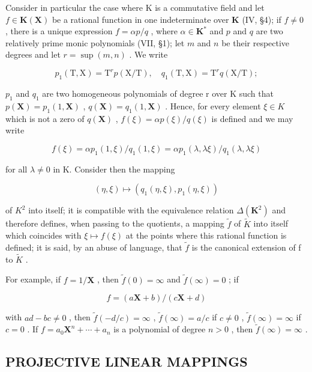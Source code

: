 Consider in particular the case where K is a commutative field and let \(f \in \mathbf{K}(\mathbf{X})\) be a rational function in one indeterminate over \(\mathbf{K}\) (IV, §4); if \(f \neq 0\) , there is a unique expression \(f = \alpha p/q\) , where \(\alpha \in \mathbf{K}^*\) and \(p\) and \(q\) are two relatively prime monic polynomials (VII, §1); let \(m\) and \(n\) be their respective degrees and let \(r = \sup(m, n)\) . We write

\[
p _ {1} (\mathrm{T}, \mathrm{X}) = \mathrm{T} ^ {r} p (\mathrm{X} / \mathrm{T}), \quad q _ {1} (\mathrm{T}, \mathrm{X}) = \mathrm{T} ^ {r} q (\mathrm{X} / \mathrm{T});
\]

\(p_{1}\) and \(q_{1}\) are two homogeneous polynomials of degree r over K such that \(p(\mathbf{X}) = p_{1}(1, \mathbf{X})\) , \(q(\mathbf{X}) = q_{1}(1, \mathbf{X})\) . Hence, for every element \(\xi \in K\) which is not a zero of \(q(\mathbf{X})\) , \(f(\xi) = \alpha p(\xi)/q(\xi)\) is defined and we may write

\[
f (\xi) = \alpha p _ {1} (1, \xi) / q _ {1} (1, \xi) = \alpha p _ {1} (\lambda , \lambda \xi) / q _ {1} (\lambda , \lambda \xi)
\]

for all \(\lambda \neq 0\) in K. Consider then the mapping

\[
(\eta , \xi) \mapsto (q _ {1} (\eta , \xi), p _ {1} (\eta , \xi))
\]

of \(K^{2}\) into itself; it is compatible with the equivalence relation \(\Delta(\mathbf{K}^{2})\) and therefore defines, when passing to the quotients, a mapping \(\tilde{f}\) of \(\tilde{K}\) into itself which coincides with \(\xi\mapsto f(\xi)\) at the points where this rational function is defined; it is said, by an abuse of language, that \(\tilde{f}\) is the canonical extension of f to \(\tilde{K}\) .

For example, if \(f = 1 / \mathbf{X}\) , then \(\tilde{f}(0) = \infty\) and \(\tilde{f}(\infty) = 0\) ; if

\[
f = (a \mathbf {X} + b) / (c \mathbf {X} + d)
\]

with \(ad - bc \neq 0\) , then \(\tilde{f}(-d/c) = \infty\) , \(\tilde{f}(\infty) = a/c\) if \(c \neq 0\) , \(\tilde{f}(\infty) = \infty\) if \(c = 0\) . If \(f = a_0\mathbf{X}^n + \cdots + a_n\) is a polynomial of degree \(n > 0\) , then \(\tilde{f}(\infty) = \infty\) .

\subsection{PROJECTIVE LINEAR MAPPINGS}

